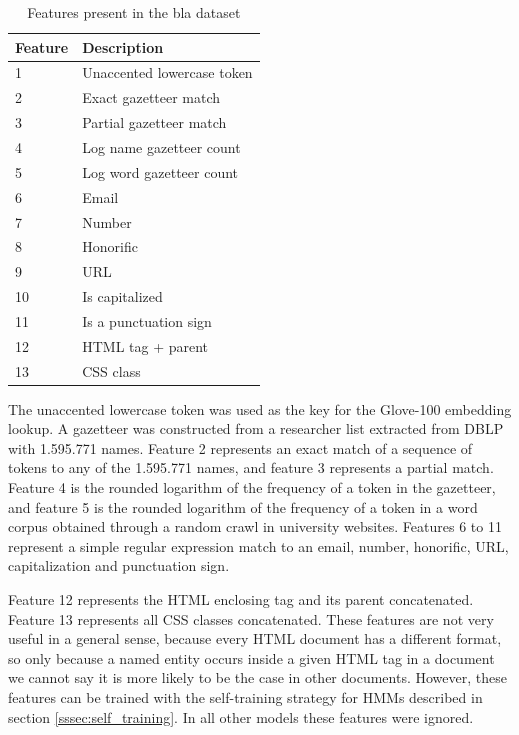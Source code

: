 \documentclass[sigconf]{acmart}
\begin{document}
\begin{table}[h]
  \small
  \begin{center}
    \begin{tabular}{ |l|l| }
      \hline
      Feature & Description \\
      \hline
      1  & Unaccented lowercase token \\
      2  & Exact gazetteer match \\
      3  & Partial gazetteer match \\
      4  & Log name gazetteer count\\
      5  & Log word gazetteer count\\
      6  & Email \\
      7  & Number \\
      8  & Honorific \\
      9  & URL \\
      10 & Is capitalized \\
      11 & Is a punctuation sign \\
      12 & HTML tag + parent \\
      13 & CSS class \\
      \hline
    \end{tabular}
  \end{center}
  \caption{Features present in the bla dataset}
  \label{tab:features}
\end{table}

The unaccented lowercase token was used as the key for the Glove-100 embedding lookup.
A gazetteer was constructed from a researcher list extracted from DBLP with 1.595.771
names. Feature 2 represents an exact match of a sequence of tokens to any of the 1.595.771 
names, and feature 3 represents a partial match. Feature 4 is the rounded logarithm of 
the frequency of a token in the gazetteer, and feature 5 is the rounded logarithm of the frequency
of a token in a word corpus obtained through a random crawl in university websites.
Features 6 to 11 represent a simple regular expression match to an email, number, 
honorific, URL, capitalization and punctuation sign.

Feature 12 represents the HTML enclosing tag and its parent concatenated. Feature 13
represents all CSS classes concatenated. These features are not very useful in a general
sense, because every HTML document has a different format, so only because a named entity
occurs inside a given HTML tag in a document we cannot say it is more likely to be the case 
in other documents. However, these features can be trained with the self-training strategy 
for HMMs described in section \ref{sssec:self_training}. In all other models these features 
were ignored.
\end{document}
